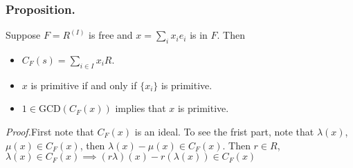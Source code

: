 \documentclass{article}
\newcommand{\beginproof}{\vspace{10pt}\newline\textit{Proof.}\hspace{1em}}
\begin{document}
\subsubsection{Proposition.} Suppose $F = R^{(I)}$ is free and $x =
\sum_ix_ie_i$ is in $F$. Then 
\begin{itemize}
\item $C_F(s) = \sum_{i\in I}x_iR$.
\item $x$ is primitive if and only if $\{x_i\}$ is primitive.
\item $1 \in \text{GCD}(C_F(x))$ implies that $x$ is primitive.
\end{itemize}  
\text{}
\beginproof First note that $C_F(x)$ is an ideal. To see the frist part, note
that $\lambda(x)$, $\mu(x) \in C_F(x)$, then $\lambda(x) - \mu(x) \in C_F(x)$.
Then $r \in R$, $\lambda(x) \in C_F(x) \implies (r\lambda)(x) - r(\lambda(x))
\in C_F(x)$
\end{document}
